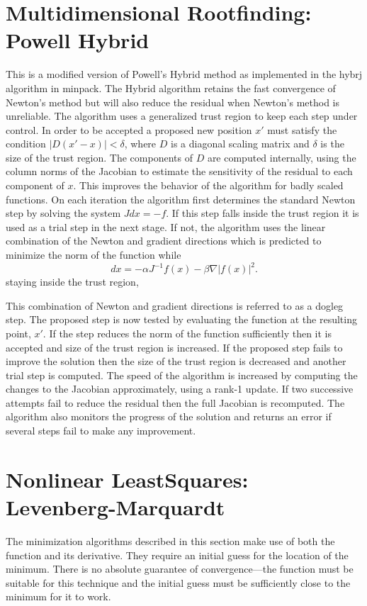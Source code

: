 \section{Multidimensional Rootfinding: Powell Hybrid}
This is a modified version of Powell’s Hybrid method as implemented in the hybrj
algorithm in minpack.  The Hybrid algorithm retains the fast convergence of Newton’s
method but will also reduce the residual when Newton’s method is unreliable.
The algorithm uses a generalized trust region to keep each step under control. In order
to be accepted a proposed new position $x′$ must satisfy the condition $|D(x′ −x)| < \delta$,
where $D$ is a diagonal scaling matrix and $\delta$ is the size of the trust region. The
components of $D$ are computed internally, using the column norms of the Jacobian
to estimate the sensitivity of the residual to each component of $x$. This improves the
behavior of the algorithm for badly scaled functions.
On each iteration the algorithm first determines the standard Newton step by solving
the system $Jdx = −f$. If this step falls inside the trust region it is used as a trial step
in the next stage. If not, the algorithm uses the linear combination of the Newton
and gradient directions which is predicted to minimize the norm of the function while
\begin{equation}
dx = −\alpha J^{−1}f(x) − \beta\nabla|f(x)|^2.
\end{equation}
staying inside the trust region,

This combination of Newton and gradient directions is referred to as a dogleg step.
The proposed step is now tested by evaluating the function at the resulting point, $x′$.
If the step reduces the norm of the function sufficiently then it is accepted and size of
the trust region is increased. If the proposed step fails to improve the solution then
the size of the trust region is decreased and another trial step is computed.
The speed of the algorithm is increased by computing the changes to the Jacobian approximately,
using a rank-1 update. If two successive attempts fail to reduce the residual
then the full Jacobian is recomputed. The algorithm also monitors the progress
of the solution and returns an error if several steps fail to make any improvement.







\section{Nonlinear LeastSquares: Levenberg-Marquardt }
The minimization algorithms described in this section make use of both the function and
its derivative. They require an initial guess for the location of the minimum. There is no
absolute guarantee of convergence—the function must be suitable for this technique and
the initial guess must be sufficiently close to the minimum for it to work.


